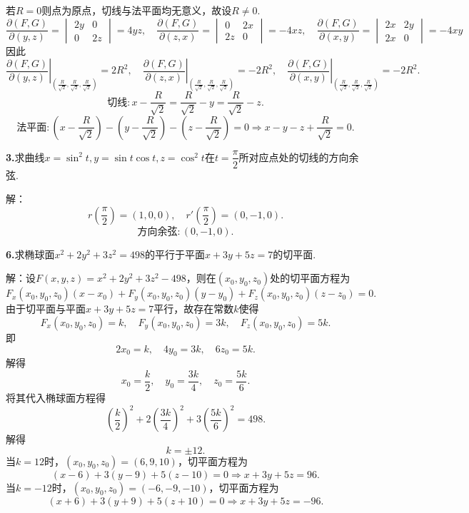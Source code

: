 \documentclass[12pt, a4paper]{article}
\begin{document}
若\(R = 0\)则点为原点，切线与法平面均无意义，故设\(R \neq 0\).
\[\frac{\partial(F, G)}{\partial(y, z)} = \begin{vmatrix}
2y & 0 \\
0 & 2z
\end{vmatrix} = 4yz, \quad \frac{\partial(F, G)}{\partial(z, x)} = \begin{vmatrix}
0 & 2x \\
2z & 0
\end{vmatrix} = -4xz, \quad \frac{\partial(F, G)}{\partial(x, y)} = \begin{vmatrix}
2x & 2y \\
2x & 0
\end{vmatrix} = -4xy\]
因此
\[\left.\frac{\partial(F, G)}{\partial(y, z)}\right|_{\left(\frac{R}{\sqrt{2}}, \frac{R}{\sqrt{2}}, \frac{R}{\sqrt{2}}\right)} = 2R^2, \quad \left.\frac{\partial(F, G)}{\partial(z, x)}\right|_{\left(\frac{R}{\sqrt{2}}, \frac{R}{\sqrt{2}}, \frac{R}{\sqrt{2}}\right)} = -2R^2, \quad \left.\frac{\partial(F, G)}{\partial(x, y)}\right|_{\left(\frac{R}{\sqrt{2}}, \frac{R}{\sqrt{2}}, \frac{R}{\sqrt{2}}\right)} = -2R^2.\]
\[\text{切线}: x - \frac{R}{\sqrt{2}} = \frac{R}{\sqrt{2}} - y = \frac{R}{\sqrt{2}} - z.\]
\[\text{法平面}: (x - \frac{R}{\sqrt{2}}) - (y - \frac{R}{\sqrt{2}}) - (z - \frac{R}{\sqrt{2}}) = 0 \Rightarrow x - y - z + \frac{R}{\sqrt{2}} = 0.\]

\textbf{3.}求曲线\(x = \sin^2 t, y = \sin t \cos t, z = \cos^2 t\)在\(t = \dfrac{\pi}{2}\)所对应点处的切线的方向余弦.

解：
\[r\left(\dfrac{\pi}{2}\right) = \left(1, 0, 0\right), \quad r'\left(\dfrac{\pi}{2}\right) = \left(0, -1, 0\right).\]
\[\text{方向余弦}: (0, -1, 0).\]

\textbf{6.}求椭球面\(x^2 + 2y^2 + 3z^2 = 498\)的平行于平面\(x + 3y + 5z = 7\)的切平面.

解：设\(F(x, y, z) = x^2 + 2y^2 + 3z^2 - 498\)，则在\((x_0, y_0, z_0)\)处的切平面方程为
\[F_x(x_0, y_0, z_0)(x - x_0) + F_y(x_0, y_0, z_0)(y - y_0) + F_z(x_0, y_0, z_0)(z - z_0) = 0.\]
由于切平面与平面\(x + 3y + 5z = 7\)平行，故存在常数\(k\)使得
\[F_x(x_0, y_0, z_0) = k, \quad F_y(x_0, y_0, z_0) = 3k, \quad F_z(x_0, y_0, z_0) = 5k.\]
即
\[2x_0 = k, \quad 4y_0 = 3k, \quad 6z_0 = 5k.\]
解得
\[x_0 = \frac{k}{2}, \quad y_0 = \frac{3k}{4}, \quad z_0 = \frac{5k}{6}.\]
将其代入椭球面方程得
\[\left(\frac{k}{2}\right)^2 + 2\left(\frac{3k}{4}\right)^2 + 3\left(\frac{5k}{6}\right)^2 = 498.\]
解得
\[k = \pm 12.\]
当\(k = 12\)时，\((x_0, y_0, z_0) = (6, 9, 10)\)，切平面方程为
\[(x - 6) + 3(y - 9) + 5(z - 10) = 0 \Rightarrow x + 3y + 5z = 96.\]
当\(k = -12\)时，\((x_0, y_0, z_0) = (-6, -9, -10)\)，切平面方程为
\[(x + 6) + 3(y + 9) + 5(z + 10) = 0 \Rightarrow x + 3y + 5z = -96.\]
\end{document}
